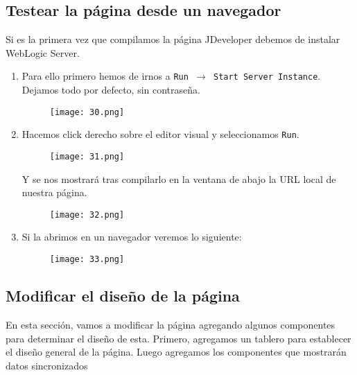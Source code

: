 \subsection{Testear la página desde un navegador}
Si es la primera vez que compilamos la página JDeveloper debemos de instalar WebLogic Server.
\begin{enumerate}
	\item  Para ello primero hemos de irnos a \texttt{Run $\rightarrow$ Start Server Instance}. Dejamos todo por defecto, sin contraseña.
	\begin{figure}[!h]
	  \centering
	    \texttt{[image: 30.png]}
	\end{figure}
	\pagebreak
	\item Hacemos click derecho sobre el editor visual y seleccionamos \texttt{Run}.
	\begin{figure}[!h]
	  \centering
	    \texttt{[image: 31.png]}
	\end{figure}

	Y se nos mostrará tras compilarlo en la ventana de abajo la URL local de nuestra página.
	\begin{figure}[!h]
	  \centering
	    \texttt{[image: 32.png]}
	\end{figure}
	\item Si la abrimos en un navegador veremos lo siguiente:
	\pagebreak
	\begin{figure}[!h]
	  \centering
	    \texttt{[image: 33.png]}
	\end{figure}
\end{enumerate}

\subsection{Modificar el diseño de la página}
En esta sección, vamos a modificar la página agregando algunos componentes para determinar el diseño de esta. Primero, agregamos un tablero para establecer el diseño general de la página. Luego agregamos los componentes que mostrarán datos sincronizados

